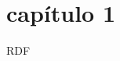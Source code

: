 \chapter{capítulo 1}
\lipsum[1-2]
\gls{RDF}\cite{buildingsmartinternationalBIMCollaborationFormat2019}
\lipsum[3-5]
